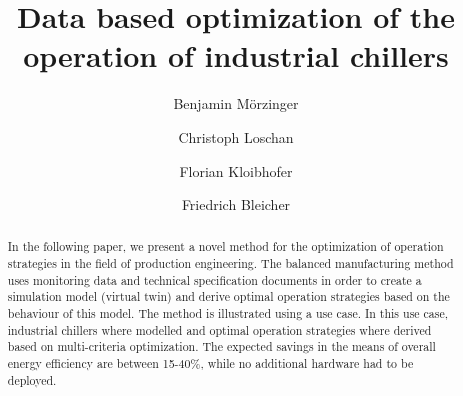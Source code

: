 \documentclass[3p,times,procedia,twocolumn,twoside]{elsarticle}
\begin{document}
\begin{frontmatter}




\title{Data based optimization of the operation of industrial chillers}




\author[a,*]{Benjamin M\"orzinger}
\author[a]{Christoph Loschan}
\author[a]{Florian Kloibhofer}
\author[a]{Friedrich Bleicher}

\address[a]{Institute for Production Engineering and Laser Technology, TU Wien, Getreidemarkt 9, Vienna, 1060, Austria}

\begin{abstract}
In the following paper, we present a novel method for the optimization of operation strategies in the field of production engineering. The balanced manufacturing method uses monitoring data and technical specification documents in order to create a simulation model (virtual twin) and derive optimal operation strategies based on the behaviour of this model. The method is illustrated using a use case. In this use case, industrial chillers where modelled and optimal operation strategies where derived based on multi-criteria optimization. The expected savings in the means of overall energy efficiency are between 15-40\%, while no additional hardware had to be deployed. 
\end{abstract}


\end{frontmatter}
\end{document}
